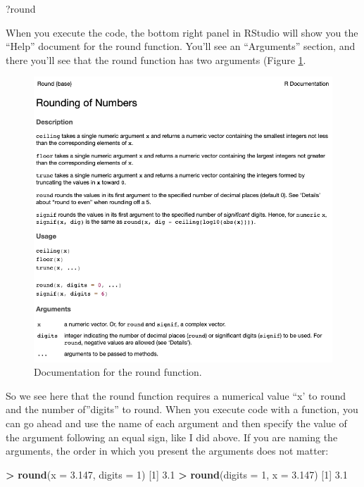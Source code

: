 \documentclass[
]{book}
\newenvironment{Shaded}{\begin{snugshade}}{\end{snugshade}}
\newcommand{\AttributeTok}[1]{\textcolor[rgb]{0.13,0.29,0.53}{#1}}
\newcommand{\DecValTok}[1]{\textcolor[rgb]{0.00,0.00,0.81}{#1}}
\newcommand{\FloatTok}[1]{\textcolor[rgb]{0.00,0.00,0.81}{#1}}
\newcommand{\FunctionTok}[1]{\textcolor[rgb]{0.13,0.29,0.53}{\textbf{#1}}}
\newcommand{\NormalTok}[1]{#1}
\newcommand{\SpecialCharTok}[1]{\textcolor[rgb]{0.81,0.36,0.00}{\textbf{#1}}}
\begin{document}
\begin{Shaded}
\begin{Highlighting}[]
\NormalTok{?round}
\end{Highlighting}
\end{Shaded}

When you execute the code, the bottom right panel in RStudio will show you the ``Help'' document for the round function. You'll see an ``Arguments'' section, and there you'll see that the round function has two arguments (Figure \ref{fig:c3f3}.

\begin{figure}

{\centering \includegraphics[width=0.8\linewidth]{images/03_documentation} 

}

\caption{Documentation for the round function.}\label{fig:c3f3}
\end{figure}

So we see here that the round function requires a numerical value ``x' to round and the number of''digits'' to round. When you execute code with a function, you can go ahead and use the name of each argument and then specify the value of the argument following an equal sign, like I did above. If you are naming the arguments, the order in which you present the arguments does not matter:

\begin{Shaded}
\begin{Highlighting}[]
\SpecialCharTok{\textgreater{}} \FunctionTok{round}\NormalTok{(}\AttributeTok{x =} \FloatTok{3.147}\NormalTok{, }\AttributeTok{digits =} \DecValTok{1}\NormalTok{)}
\NormalTok{[}\DecValTok{1}\NormalTok{] }\FloatTok{3.1}
\SpecialCharTok{\textgreater{}} \FunctionTok{round}\NormalTok{(}\AttributeTok{digits =} \DecValTok{1}\NormalTok{, }\AttributeTok{x =} \FloatTok{3.147}\NormalTok{)}
\NormalTok{[}\DecValTok{1}\NormalTok{] }\FloatTok{3.1}
\end{Highlighting}
\end{Shaded}
\end{document}
